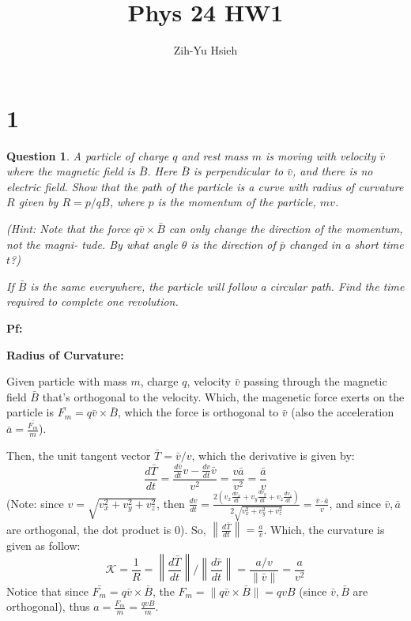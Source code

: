 \documentclass{article}
\title{Phys 24 HW1}
\author{Zih-Yu Hsieh}
\newtheorem{question}{Question}
\begin{document}
\maketitle

\section*{1}
\begin{myBox}[]{}
    \begin{question}
        A particle of charge $q$ and rest mass $m$ is moving with velocity $\bar{v}$
        where the magnetic field is $\bar{B}$. Here $\bar{B}$ is perpendicular to $\bar{v}$, and
        there is no electric field. Show that the path of the particle is a
        curve with radius of curvature $R$ given by $R = p/qB$, where $p$ is the
        momentum of the particle, $mv$. 
        
        (Hint: Note that the force $q\bar{v}\times\bar{B}$
        can only change the direction of the momentum, not the magni-
        tude. By what angle $\theta$ is the direction of $\bar{p}$ changed in a short time $t$?) 
        
        If $\bar{B}$ is the same everywhere, the particle will follow a
        circular path. Find the time required to complete one revolution.
    \end{question}
\end{myBox}

\textbf{Pf:}

\textbf{Radius of Curvature:}

Given particle with mass $m$, charge $q$, velocity $\bar{v}$ passing through the magnetic field $\bar{B}$ that's orthogonal to the velocity.
Which, the magenetic force exerts on the particle is $\bar{F_m} = q\bar{v}\times \bar{B}$, which the force is orthogonal to $\bar{v}$ (also the acceleration $\bar{a}=\frac{\bar{F_m}}{m}$).

Then, the unit tangent vector $\bar{T}=\bar{v}/v$, which the derivative is given by:
$$\frac{d\bar{T}}{dt} = \frac{\frac{d\bar{v}}{dt}v - \frac{dv}{dt}\bar{v}}{v^2} = \frac{v\bar{a}}{v^2} = \frac{\bar{a}}{v}$$
(Note: since $v = \sqrt{v_x^2+v_y^2+v_z^2}$, then $\frac{dv}{dt}=\frac{2(v_x\frac{dv_x}{dt}+v_y\frac{dv_y}{dt}+v_z\frac{dv_z}{dt})}{2\sqrt{v_x^2+v_y^2+v_z^2}} = \frac{\bar{v}\cdot\bar{a}}{v}$, and since $\bar{v},\bar{a}$ are orthogonal, the dot product is 0).
So, $\left\|\frac{d\bar{T}}{dt}\right\|=\frac{a}{v}$. Which, the curvature is given as follow:
$$\mathcal{K}=\frac{1}{R}=\left\|\frac{d\bar{T}}{dt}\right\|/\left\|\frac{d\bar{r}}{dt}\right\| = \frac{a/v}{\|\bar{v}\|} = \frac{a}{v^2}$$
Notice that since $\bar{F_m} = q\bar{v}\times \bar{B}$, the $F_m = \|q\bar{v}\times \bar{B}\| = qvB$ (since $\bar{v},\bar{B}$ are orthogonal), thus $a = \frac{F_m}{m} = \frac{qvB}{m}$.
\end{document}
